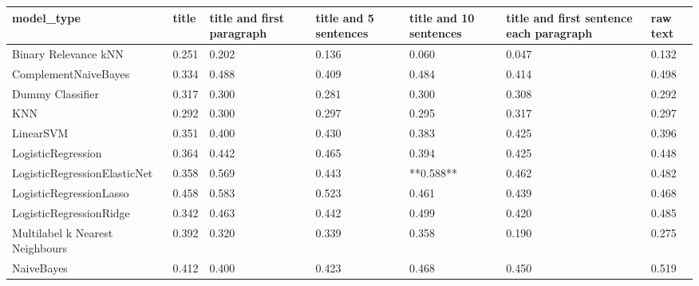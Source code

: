 \begin{tabular}{lllllll}
\toprule
                     model\_type & title & title and first paragraph & title and 5 sentences & title and 10 sentences & title and first sentence each paragraph & raw text \\
\midrule
           Binary Relevance kNN & 0.251 &                     0.202 &                 0.136 &                  0.060 &                                   0.047 &    0.132 \\
           ComplementNaiveBayes & 0.334 &                     0.488 &                 0.409 &                  0.484 &                                   0.414 &    0.498 \\
               Dummy Classifier & 0.317 &                     0.300 &                 0.281 &                  0.300 &                                   0.308 &    0.292 \\
                            KNN & 0.292 &                     0.300 &                 0.297 &                  0.295 &                                   0.317 &    0.297 \\
                      LinearSVM & 0.351 &                     0.400 &                 0.430 &                  0.383 &                                   0.425 &    0.396 \\
             LogisticRegression & 0.364 &                     0.442 &                 0.465 &                  0.394 &                                   0.425 &    0.448 \\
   LogisticRegressionElasticNet & 0.358 &                     0.569 &                 0.443 &              **0.588** &                                   0.462 &    0.482 \\
        LogisticRegressionLasso & 0.458 &                     0.583 &                 0.523 &                  0.461 &                                   0.439 &    0.468 \\
        LogisticRegressionRidge & 0.342 &                     0.463 &                 0.442 &                  0.499 &                                   0.420 &    0.485 \\
Multilabel k Nearest Neighbours & 0.392 &                     0.320 &                 0.339 &                  0.358 &                                   0.190 &    0.275 \\
                     NaiveBayes & 0.412 &                     0.400 &                 0.423 &                  0.468 &                                   0.450 &    0.519 \\

\end{tabular}
